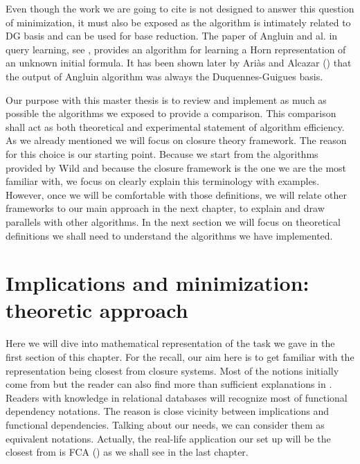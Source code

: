 \vspace{1.2em}

Even though the work we are going to cite is not designed to answer this 
question of minimization, it must also be exposed as the algorithm is 
intimately related to DG basis and can be used for base reduction. The paper
of Angluin and al. in query learning, see \cite{angluin_learning_1992}, provides
an algorithm for learning a Horn representation of an unknown initial formula. 
It has been shown later by Ariàs and Alcazar (\cite{arias_canonical_2009}) that
the output of Angluin algorithm was always the Duquennes-Guigues basis.

\vspace{1.2em}

Our purpose with this master thesis is to review and implement as much as 
possible the algorithms we exposed to provide a comparison. This comparison 
shall act as both theoretical and experimental statement of algorithm 
efficiency. As we already mentioned we will focus on closure theory framework.
The reason for this choice is our starting point. Because we start from the
algorithms provided by Wild and because the closure framework is the one we 
are the most familiar with, we focus on clearly explain this terminology with
examples. However, once we will be comfortable with those definitions, we will 
relate other frameworks to our main approach in the next chapter, to explain and
draw parallels with other algorithms. In the next section we will focus on 
theoretical definitions we shall need to understand the algorithms we have 
implemented.



\section{Implications and minimization: theoretic approach}

Here we will dive into mathematical representation of the task we gave
in the first section of this chapter. For the recall, our aim here is to
get familiar with the representation being closest from closure systems.  Most 
of the notions initially come from \cite{guigues_j.l_familles_1986, 
ganter_two_2010, wild_theory_1994,	ganter_formal_1999} but the reader can 
also find more than sufficient explanations in \cite{b._ganter_conceptual_2016, 
wild_joy_2017}. Readers with knowledge in relational databases will recognize 
most of functional dependency notations. The reason is close vicinity between 
implications and functional dependencies. Talking about our needs, we can 
consider them as equivalent notations. Actually, the real-life application our 
set up will be the closest from is FCA (\cite{ganter_formal_1999}) as we shall
see in the last chapter.


